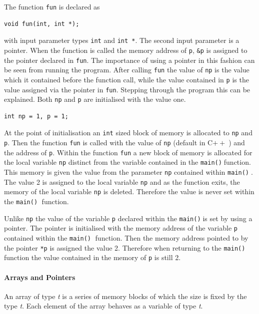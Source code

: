 \documentclass[11pt,a4paper]{scrartcl}
\def\cpp{C$++\;$}
\def\main{\texttt{main()}$\;$}
\begin{document}
The function \texttt{fun} is declared as 
\begin{verbatim}void fun(int, int *);\end{verbatim}
with input parameter types \texttt{int} and \texttt{int *}.  The
second input parameter is a pointer.  When the function is called the
memory address of \texttt{p}, \texttt{\&p} is assigned to the pointer
declared in \texttt{fun}.  The importance of using a pointer in this
fashion can be seen from running the program.  After calling
\texttt{fun} the value of \texttt{np} is the value which it contained
before the function call, while the value contained in \texttt{p} is
the value assigned via the pointer in
\texttt{fun}.  Stepping through the program this can be explained.
Both \texttt{np} and \texttt{p} are initialised with the value one.
\begin{verbatim}int np = 1, p = 1;\end{verbatim}
At the point of initialisation an \texttt{int} sized block of memory
is allocated to \texttt{np} and \texttt{p}.  Then the function
\texttt{fun} is called with the value of \texttt{np} (default in \cpp) and the
address of \texttt{p}.  Within the function \texttt{fun} a new block
of memory is allocated for the local variable \texttt{np} distinct
from the variable contained in the \main function.  This memory is
given the value from the parameter \texttt{np} contained within
\main.  The value 2 is assigned to the local variable \texttt{np}
and as the function exits, the memory of the local variable \texttt{np}
is deleted.  Therefore the value is never set within the \main
function.

Unlike \texttt{np} the value of the variable \texttt{p} declared within
the \main is set by using a pointer.  The pointer is initialised with the
memory address of the variable \texttt{p} contained within the \main
function.  Then the memory address pointed to by the pointer
\texttt{*p} is assigned the value 2.  Therefore when returning to the
\main function the value contained in the memory of \texttt{p} is
still 2.

\paragraph{Arrays and Pointers}

An array of type {\it t} is a series of memory blocks of which the
size is fixed by the type {\it t}.  Each element of the array behaves
as a variable of type {\it t}.
\end{document}
